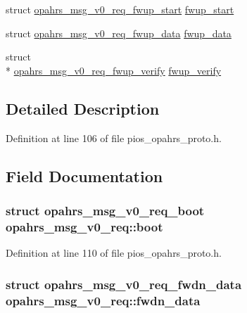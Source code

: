 \begin{DoxyCompactItemize}
\item 
struct \hyperlink{structopahrs__msg__v0__req__fwup__start}{opahrs\-\_\-msg\-\_\-v0\-\_\-req\-\_\-fwup\-\_\-start} \hyperlink{unionopahrs__msg__v0__req_a7eb2172f026850a2624a03821944a47f}{fwup\-\_\-start}
\item 
struct \hyperlink{structopahrs__msg__v0__req__fwup__data}{opahrs\-\_\-msg\-\_\-v0\-\_\-req\-\_\-fwup\-\_\-data} \hyperlink{unionopahrs__msg__v0__req_a642fe114f1e4a4ff132f3b51c824a9c2}{fwup\-\_\-data}
\item 
struct \\*
\hyperlink{structopahrs__msg__v0__req__fwup__verify}{opahrs\-\_\-msg\-\_\-v0\-\_\-req\-\_\-fwup\-\_\-verify} \hyperlink{unionopahrs__msg__v0__req_a58e1c51c26b939de6eded87cdbb22ae6}{fwup\-\_\-verify}
\end{DoxyCompactItemize}


\subsection{Detailed Description}


Definition at line 106 of file pios\-\_\-opahrs\-\_\-proto.\-h.



\subsection{Field Documentation}
\hypertarget{unionopahrs__msg__v0__req_af965183b84782f01b4f9b90cb2299cc0}{
\subsubsection[{boot}]{\setlength{\rightskip}{0pt plus 5cm}struct {\bf opahrs\-\_\-msg\-\_\-v0\-\_\-req\-\_\-boot} opahrs\-\_\-msg\-\_\-v0\-\_\-req\-::boot}}\label{unionopahrs__msg__v0__req_af965183b84782f01b4f9b90cb2299cc0}


Definition at line 110 of file pios\-\_\-opahrs\-\_\-proto.\-h.

\hypertarget{unionopahrs__msg__v0__req_a5b45e9edc10e3e83f03b936607ddcb76}{
\subsubsection[{fwdn\-\_\-data}]{\setlength{\rightskip}{0pt plus 5cm}struct {\bf opahrs\-\_\-msg\-\_\-v0\-\_\-req\-\_\-fwdn\-\_\-data} opahrs\-\_\-msg\-\_\-v0\-\_\-req\-::fwdn\-\_\-data}}\label{unionopahrs__msg__v0__req_a5b45e9edc10e3e83f03b936607ddcb76}



